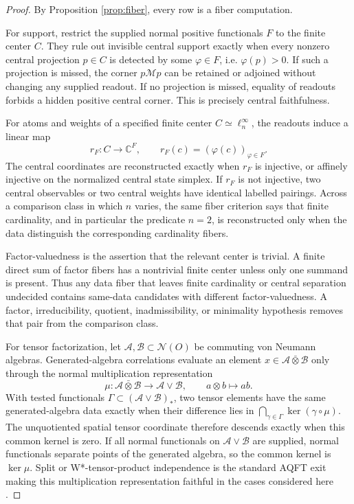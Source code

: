 \documentclass[12pt]{article}
\theoremstyle{definition}
\theoremstyle{remark}
\newcommand{\A}{\mathcal A}
\newcommand{\B}{\mathcal B}
\newcommand{\C}{\mathbb C}
\newcommand{\M}{\mathcal M}
\newcommand{\N}{\mathcal N}
\begin{document}
\begin{proof}
By Proposition \ref{prop:fiber}, every row is a fiber computation.

For support, restrict the supplied normal positive functionals \(F\) to the
finite center \(C\).  They rule out invisible central support exactly when
every nonzero central projection \(p\in C\) is detected by some
\(\varphi\in F\), i.e. \(\varphi(p)>0\).  If such a projection is missed, the
corner \(p\M p\) can be retained or adjoined without changing any supplied
readout.  If no projection is missed, equality of readouts forbids a hidden
positive central corner.  This is precisely central faithfulness.

For atoms and weights of a specified finite center
\(C\simeq\ell^\infty_n\), the readouts induce a linear map
\[
  r_F:C\to \C^F,\qquad r_F(c)=(\varphi(c))_{\varphi\in F}.
\]
The central coordinates are reconstructed exactly when \(r_F\) is injective,
or affinely injective on the normalized central state simplex.  If \(r_F\) is
not injective, two central observables or two central weights have identical
labelled pairings.  Across a comparison class in which \(n\) varies, the same
fiber criterion says that finite cardinality, and in particular the predicate
\(n=2\), is reconstructed only when the data distinguish the corresponding
cardinality fibers.

Factor-valuedness is the assertion that the relevant center is trivial.  A
finite direct sum of factor fibers has a nontrivial finite center unless only
one summand is present.  Thus any data fiber that leaves finite cardinality or
central separation undecided contains same-data candidates with different
factor-valuedness.  A factor, irreducibility, quotient, inadmissibility, or
minimality hypothesis removes that pair from the comparison class.

For tensor factorization, let
\(\A,\B\subset \N(O)\) be commuting von Neumann algebras.  Generated-algebra
correlations evaluate an element \(x\in\A\bar\otimes\B\) only through the
normal multiplication representation
\[
  \mu:\A\bar\otimes\B\to\A\vee\B,\qquad a\otimes b\mapsto ab .
\]
With tested functionals \(\Gamma\subset(\A\vee\B)_*\), two tensor elements
have the same generated-algebra data exactly when their difference lies in
\(\bigcap_{\gamma\in\Gamma}\ker(\gamma\circ\mu)\).  The unquotiented spatial
tensor coordinate therefore descends exactly when this common kernel is zero.
If all normal functionals on \(\A\vee\B\) are supplied, normal functionals
separate points of the generated algebra, so the common kernel is \(\ker\mu\).
Split or W*-tensor-product independence is the standard AQFT exit making this
multiplication representation faithful in the cases considered here
\cite{DoplicherLongoSplit,BuchholzWichmann,WernerSplit}.


\end{proof}
\end{document}
